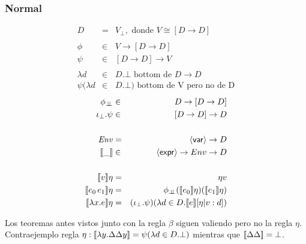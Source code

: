    \subsubsection{Normal}
      \begin{multicols}{2}
        \begin{eqnarray*}
          D &=& V_\bot, \text{ donde } V \cong [D \to  D] \\ \\
          \phi &\in& V \to  [D \to  D] \\
          \psi &\in& [D \to  D] \to  V \\ \\ 
          \lambda d &\in& D. \bot \text{ bottom de } D \rightarrow D \\
          \psi(\lambda d &\in& D. \bot) \text{ bottom de V pero no de D}
        \end{eqnarray*}
        \begin{eqnarray*}
          \phi_{\bot\!\!\!\bot} &\in& D \to  [D \to  D] \\
          \iota_\bot . \psi &\in& [D \to  D] \to  D \\ \\
          \mathit{Env} &=& \langle \mathsf{var} \rangle \to  D \\
          \llbracket\_\rrbracket &\in& \langle \mathsf{expr} \rangle \to  Env \to  D \\ \\
          \llbracket v \rrbracket\eta &=& \eta v \\
          \llbracket e_0\, e_1\rrbracket\eta &=& \phi_{\bot\!\!\!\bot} (\llbracket e_0\rrbracket\eta) (\llbracket e_1\rrbracket\eta) \\
          \llbracket\lambda x.e\rrbracket\eta &=& (\iota_\bot . \psi)(\lambda d \in D. \llbracket e\rrbracket[\eta|v:d])
        \end{eqnarray*}
      \end{multicols}
      \PN Los teoremas antes vistos junto con la regla $\beta$ siguen valiendo pero no la regla $\eta$.
      \PN Contraejemplo regla $\eta: [\![\lambda y. \Delta\Delta y]\!] = \psi(\lambda d \in D.\bot)$ mientras que $[\![\Delta\Delta]\!] = \bot$.    

